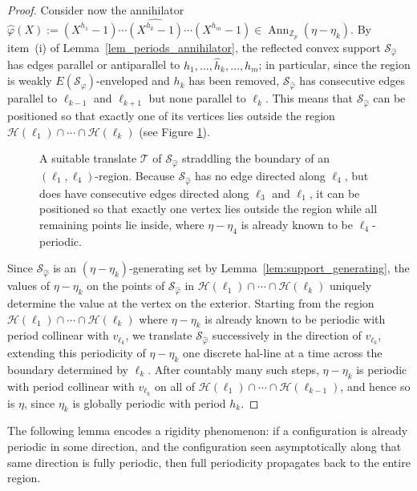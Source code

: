 \documentclass[12pt]{amsart}
\numberwithin{equation}{section}
\DeclareMathOperator{\Ann}{Ann}
\begin{document}
\begin{proof}
Consider now the annihilator $ \hat\varphi(X) := (X^{h_1} - 1) \cdots \widehat{(X^{h_k} - 1)} \cdots (X^{h_m} - 1) \in \Ann_{\mathbb Z_p}(\eta - \eta_k)$. By item~(i) of Lemma~\ref{lem_periods_annihilator}, the reflected convex support $ \mathcal S_{\hat \varphi}$ has edges parallel or antiparallel to $ h_1, \ldots, \hat{h}_k, \ldots, h_m $; in particular, since the region is weakly $E(\mathcal S_\varphi)$-enveloped and $ h_k $ has been removed, $ \mathcal S_{\hat \varphi} $ has consecutive edges parallel to $\pmb{\ell}_{k-1} $ and $\pmb{\ell}_{k+1}$ but none parallel to $ \pmb{\ell}_k$. This means that $\mathcal S_{\hat \varphi}$ can be positioned so that exactly one of its vertices lies outside the region $\mathcal H(\pmb{\ell}_1)\cap \cdots \cap \mathcal{H}(\pmb{\ell}_{k})$ (see Figure \ref{fig1}). 
\begin{figure}[ht]
	\centering\def\svgwidth{9.8cm}
	\caption{A suitable translate $\mathcal{T}$ of $\mathcal{S}_{\hat{\varphi}}$
straddling the boundary of an $(\pmb{\ell}_1,\pmb{\ell}_4)$-region. 
Because $\mathcal{S}_{\hat\varphi}$ has no edge directed along $\ell_4$, 
but does have consecutive edges directed along $ \ell_3$ and 
$ \ell_1 $, it can be positioned so that exactly one vertex lies 
outside the region while all remaining points lie inside, where $\eta-\eta_4$ 
is already known to be $\ell_4$-periodic.}
	\label{fig1}
\end{figure}
Since $ \mathcal S_{\hat \varphi} $ is an $(\eta - \eta_k)$-generating set by Lemma~\ref{lem:support_generating}, the values of $ \eta - \eta_k $ on the points of $ \mathcal S_{\hat \varphi} $ in  
$\mathcal H(\pmb{\ell}_1)\cap \cdots \cap \mathcal{H}(\pmb{\ell}_{k})$ uniquely determine the value at the vertex on the exterior. Starting from the region $\mathcal H(\pmb{\ell}_1)\cap \cdots \cap \mathcal{H}(\pmb{\ell}_{k})$ where $ \eta - \eta_k $ is already known to be periodic with period collinear with $v_{\pmb{\ell}_k}$, we translate  $ \mathcal S_{\hat \varphi} $ successively in the direction of $ v_{\pmb{\ell}_k}$, extending this periodicity of $\eta - \eta_k$ one discrete hal-line at a time across the boundary determined by $ \pmb{\ell}_k$. After countably many such steps, $ \eta - \eta_k $ is periodic with period collinear with $v_{\pmb{\ell}_k}$ on all of $\mathcal H(\pmb{\ell}_1)\cap \cdots \cap \mathcal{H}(\pmb{\ell}_{k-1})$, and hence so is $ \eta $, since $ \eta_k $ is globally periodic with period $ h_k $.
\end{proof}

The following lemma encodes a rigidity phenomenon: if a configuration
is already periodic in some direction, and the configuration seen
asymptotically along that same direction is fully periodic, then full
periodicity propagates back to the entire region.
\end{document}

